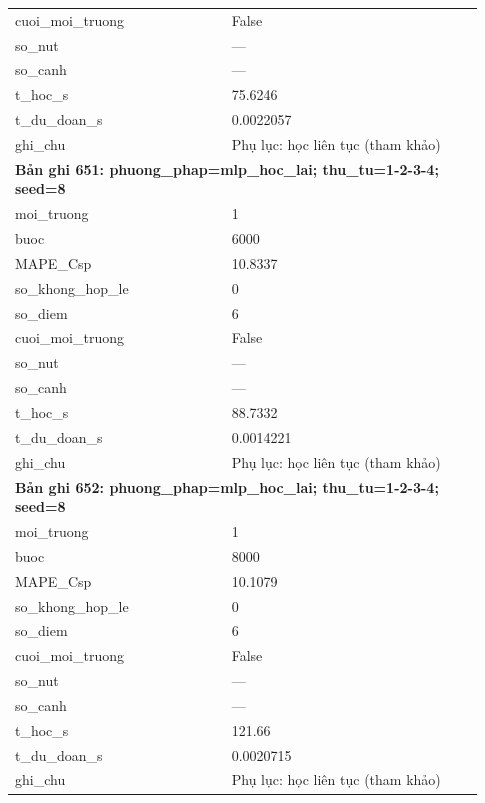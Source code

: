 \begin{longtable}{p{0.43\linewidth}p{0.50\linewidth}}
cuoi\_\allowbreak moi\_\allowbreak truong & False \\
so\_\allowbreak nut & — \\
so\_\allowbreak canh & — \\
t\_\allowbreak hoc\_\allowbreak s & 75.6246 \\
t\_\allowbreak du\_\allowbreak doan\_\allowbreak s & 0.0022057 \\
ghi\_\allowbreak chu & Phụ lục: học liên tục (tham khảo) \\
\midrule
\multicolumn{2}{p{0.95\linewidth}}{\textbf{Bản ghi 651: phuong\_phap=mlp\_hoc\_lai; thu\_tu=1-2-3-4; seed=8}} \\
moi\_\allowbreak truong & 1 \\
buoc & 6000 \\
MAPE\_\allowbreak Csp & 10.8337 \\
so\_\allowbreak khong\_\allowbreak hop\_\allowbreak le & 0 \\
so\_\allowbreak diem & 6 \\
cuoi\_\allowbreak moi\_\allowbreak truong & False \\
so\_\allowbreak nut & — \\
so\_\allowbreak canh & — \\
t\_\allowbreak hoc\_\allowbreak s & 88.7332 \\
t\_\allowbreak du\_\allowbreak doan\_\allowbreak s & 0.0014221 \\
ghi\_\allowbreak chu & Phụ lục: học liên tục (tham khảo) \\
\midrule
\multicolumn{2}{p{0.95\linewidth}}{\textbf{Bản ghi 652: phuong\_phap=mlp\_hoc\_lai; thu\_tu=1-2-3-4; seed=8}} \\
moi\_\allowbreak truong & 1 \\
buoc & 8000 \\
MAPE\_\allowbreak Csp & 10.1079 \\
so\_\allowbreak khong\_\allowbreak hop\_\allowbreak le & 0 \\
so\_\allowbreak diem & 6 \\
cuoi\_\allowbreak moi\_\allowbreak truong & False \\
so\_\allowbreak nut & — \\
so\_\allowbreak canh & — \\
t\_\allowbreak hoc\_\allowbreak s & 121.66 \\
t\_\allowbreak du\_\allowbreak doan\_\allowbreak s & 0.0020715 \\
ghi\_\allowbreak chu & Phụ lục: học liên tục (tham khảo) \\

\end{longtable}
